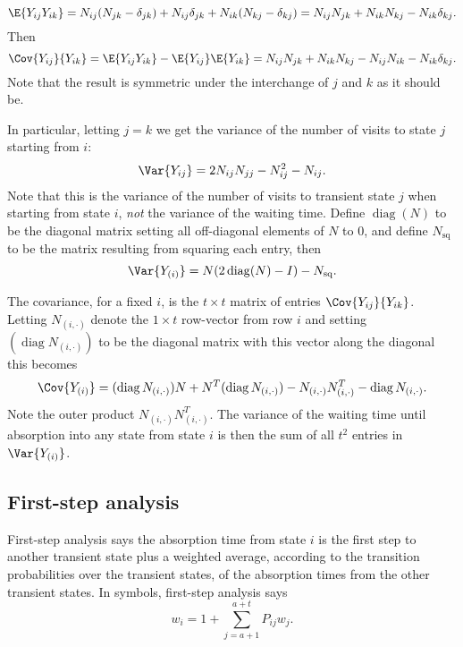 \documentclass[12pt]{article}
\begin{document}
\[
    \E{Y_{ij} Y_{ik}} = N_{ij}(N_{jk}-\delta_{jk}) + N_{ij} \delta_{jk}
    + N_{ik}(N_{kj}-\delta_{kj}) = N_{ij}N_{jk} + N_{ik}N_{kj} - N_{ik}\delta_
    {kj}.
\] Then
\begin{equation}
    \Cov{Y_{ij}}{Y_{ik}} = \E{Y_{ij} Y_{ik}} - \E{Y_{ij}} \E{Y_{ik}} = N_
    {ij}N_{jk} + N_{ik}N_{kj} - N_{ij}N_{ik} - N_{ik}\delta_{kj}.%
    \label{eq:newwaitingtime:cov}
\end{equation}
Note that the result is symmetric under the interchange of \( j \) and \(
k \) as it should be.

In particular, letting \( j=k \) we get the variance of the number of
visits to state \( j \) starting from \( i \):
\[
    \Var{Y_{ij}} = 2 N_{ij}N_{jj} - N_{ij}^2 - N_{ij}.
\] Note that this is the variance of the number of visits to transient
state \( j \) when starting from state \( i \), \emph{not} the variance
of the waiting time. Define \(
\operatorname{diag}
(N) \) to be the diagonal matrix setting all off-diagonal elements of \(
N \) to \( 0 \), and define \( N_{\text{sq}} \) to be the matrix
resulting from squaring each entry, then
\[
    \Var{Y_{(i)}} = N(2
    \operatorname{diag}
    (N) - I) - N_{\text{sq}}.
\]

The covariance, for a fixed \( i \), is the \( t \times t \) matrix of
entries \( \Cov{Y_{ij}}{ Y_{ik}} \).  Letting \( N_{(i,\cdot)} \) denote
the \( 1 \times t \) row-vector from row \( i \) and setting \( (
\operatorname{diag}
N_{(i,\cdot)}) \) to be the diagonal matrix with this vector along the
diagonal this becomes
\[
    \Cov{Y_{(i)}} = (
    \operatorname{diag}
    {N_{(i,\cdot)}}) N + N^T (
    \operatorname{diag}
    {N_{(i,\cdot)}}) - N_{(i,\cdot)} N_{(i,\cdot)}^T -
    \operatorname{diag}
    N_{(i,\cdot)}.
\] Note the outer product \( N_{(i,\cdot)} N_{(i,\cdot)}^T \). The
variance of the waiting time until absorption into any state from state \(
i \) is then the sum of all \( t^2 \) entries in \( \Var{Y_{(i)}} \).

\subsection*{First-step analysis}

First-step analysis%
says the absorption time from state \( i \) is the first step to another
transient state plus a weighted average, according to the transition
probabilities over the transient states, of the absorption times from
the other transient states.  In symbols, first-step analysis says
\[
    w_i = 1 + \sum\limits_{j=a+1}^{a+t} P_{ij} w_j.
\]
\end{document}
